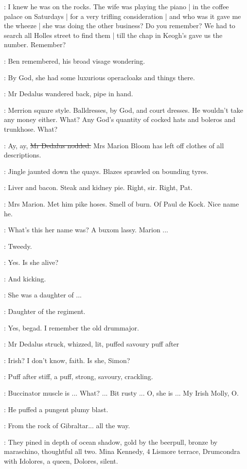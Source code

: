 \cowley:
I knew he was on the rocks.
The wife was playing the piano |
in the coffee palace on Saturdays |
for a very trifling consideration |
and who was it gave me the wheeze |
she was doing the other business?
Do you remember?
We had to search all Holles street to find them |
till the chap in Keogh's gave us the number.
Remember?

:
Ben remembered,
his broad visage wondering.

\dollard:
By God,
she had some luxurious operacloaks
and things there.

:
Mr Dedalus wandered back,
pipe in hand.

\dollard:
Merrion square style.
Balldresses,
by God,
and court dresses.
He wouldn't take any money either.
What?
Any God's quantity of cocked hats
and boleros and trunkhose.
What?

\simon:
Ay, ay,
\sout{Mr Dedalus nodded.}
Mrs Marion Bloom has left off clothes of all descriptions.

:
Jingle jaunted down the quays.
Blazes sprawled on bounding tyres.

\BloomInt:
Liver and bacon.
Steak and kidney pie.
Right, sir.
Right, Pat.

\BloomInt:
Mrs Marion.
Met him pike hoses.
Smell of burn.
Of Paul de Kock.
Nice name he.

\dollard:
What's this her name was?
A buxom lassy.
Marion ...

\simon:
Tweedy.

\dollard:
Yes.
Is she alive?

\simon:
And kicking.

\dollard:
She was a daughter of ...

\simon:
Daughter of the regiment.

\dollard:
Yes,
begad.
I remember the old drummajor.

:
Mr Dedalus struck,
whizzed,
lit,
puffed savoury puff after

\dollard:
Irish?
I don't know,
faith.
Is she,
Simon?

:
Puff after stiff,
a puff,
strong,
savoury,
crackling.

\simon:
Buccinator muscle is ...
What?
...
Bit rusty ...
O,
she is ...
My Irish Molly,
O.

:
He puffed a pungent plumy blast.

\simon:
From the rock of Gibraltar...
all the way.

:
They pined in depth of ocean shadow,
gold by the beerpull,
bronze by ma\-ra\-schi\-no,
thoughtful all two.
Mina Kennedy,
4 Lismore terrace,
Drumcondra
with Idolores,
a queen,
Dolores,
silent.

